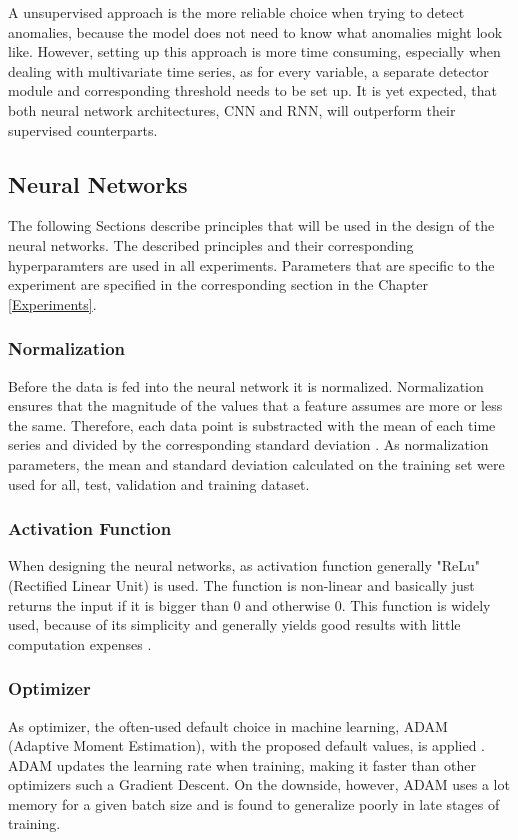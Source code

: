 A unsupervised approach is the more reliable choice when trying to detect anomalies, because the model does not need to know what anomalies might look like. However, setting up this approach is more time consuming, especially when dealing with multivariate time series, as for every variable, a separate detector module and corresponding threshold needs to be set up. It is yet expected, that both neural network architectures, CNN and RNN, will outperform their supervised counterparts. 

\subsection{Neural Networks}
The following Sections describe principles that will be used in the design of the neural networks. The described principles and their corresponding hyperparamters are used in all experiments. Parameters that are specific to the experiment are specified in the corresponding section in the Chapter \ref{Experiments}. 

\subsubsection{Normalization}
Before the data is fed into the neural network it is normalized. Normalization ensures that the magnitude of the values that a feature assumes are more or less the same. Therefore, each data point is substracted with the mean of each time series and divided by the corresponding standard deviation \parencite{Stöttner2019}. As normalization parameters, the mean and standard deviation calculated on the training set were used for all, test, validation and training dataset.  

\subsubsection{Activation Function}
When designing the neural networks, as activation function generally "ReLu" (Rectified Linear Unit) is used. The function is non-linear and basically just returns the input if it is bigger than 0 and otherwise 0. This function is widely used, because of its simplicity and generally yields good results with little computation expenses \parencite{Brownlee2019.2}.  

\subsubsection{Optimizer}
As optimizer, the often-used default choice in machine learning, ADAM (Adaptive Moment Estimation), with the proposed default values, is applied \parencite{Katanforoosh2019}. ADAM updates the learning rate when training, making it faster than other optimizers such a Gradient Descent. On the downside, however, ADAM uses a lot memory for a given batch size and is found to generalize poorly in late stages of training.

